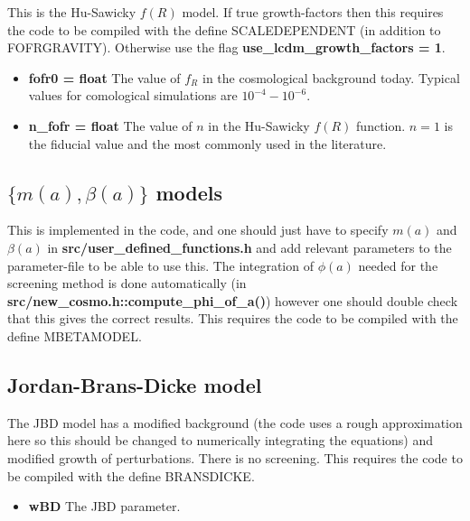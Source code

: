 \documentclass[usenatbib]{article}
\begin{document}
This is the Hu-Sawicky $f(R)$ model. If true growth-factors then this requires the code to be compiled with the define SCALEDEPENDENT (in addition to FOFRGRAVITY). Otherwise use the flag \textbf{use\_lcdm\_growth\_factors = 1}.

\begin{itemize}

\item \textbf{fofr0 = float} The value of $f_R$ in the cosmological background today. Typical values for comological simulations are $10^{-4}-10^{-6}$.

\item \textbf{n\_fofr = float} The value of $n$ in the Hu-Sawicky $f(R)$ function. $n=1$ is the fiducial value and the most commonly used in the literature.

\end{itemize}

\subsection*{$\{m(a),\beta(a)\}$ models}

This is implemented in the code, and one should just have to specify $m(a)$ and $\beta(a)$ in \textbf{src/user\_defined\_functions.h} and add relevant parameters to the parameter-file to be able to use this. The integration of $\phi(a)$ needed for the screening method is done automatically (in \textbf{src/new\_cosmo.h::compute\_phi\_of\_a()}) however one should double check that this gives the correct results. This requires the code to be compiled with the define MBETAMODEL.

\subsection*{Jordan-Brans-Dicke model}

The JBD model has a modified background (the code uses a rough approximation here so this should be changed to numerically integrating the equations) and modified growth of perturbations. There is no screening. This requires the code to be compiled with the define BRANSDICKE.

\begin{itemize}

\item \textbf{wBD} The JBD parameter.

\end{itemize}
\end{document}
